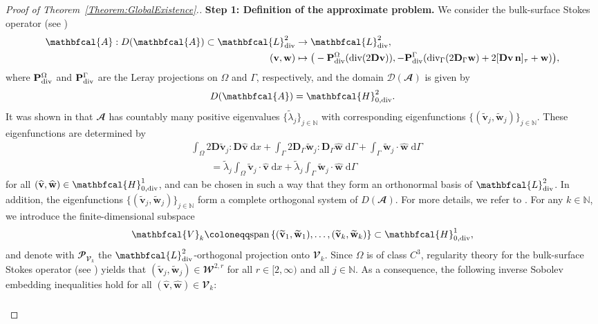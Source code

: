 \documentclass[10pt,reqno]{amsart}
\theoremstyle{remark}
\numberwithin{equation}{section}
\newcommand{\N}{\mathbb N}
\newcommand{\n}{\mathbf{n}}
\newcommand{\bv}{\mathbf{v}}
\newcommand{\bw}{\mathbf{w}}
\newcommand{\ww}{\widehat{\bw}}
\newcommand{\wv}{\widehat{\bv}}
\newcommand{\tv}{\widetilde{\bv}}
\newcommand{\tw}{\widetilde{\bw}}
\newcommand{\D}{\mathbf{D}}
\newcommand{\Dg}{\mathbf{D}_\Gamma}
\newcommand{\intO}{\int_\Omega}
\newcommand{\intG}{\int_\Gamma}
\newcommand{\dx}{\;\mathrm{d}x}
\newcommand{\dG}{\;\mathrm d\Ga}
\newcommand{\Div}{\textnormal{div}}
\newcommand{\Divg}{\textnormal{div}_\Ga}
\newcommand{\Om}{\Omega}
\newcommand{\Ga}{\Gamma}
\begin{document}
\begin{proof}[Proof of Theorem~\ref{Theorem:GlobalExistence}.]
\textbf{Step 1: Definition of the approximate problem.}
We consider the bulk-surface Stokes operator (see \cite[Section~5.3]{Knopf2025a})
\begin{align*}
    \mathbfcal{A}:D(\mathbfcal{A})\subset \mathbfcal{L}^2_\Div&\rightarrow\mathbfcal{L}^2_\Div, \\
    (\bv,\bw)&\mapsto \big(-\mathbf{P}_\Div^\Om(\Div(2\D\bv)), -\mathbf{P}_\Div^\Ga(\Divg(2\Dg\bw) + 2[\D\bv\,\n]_\tau + \bw)\big),
\end{align*}
where $\mathbf{P}_\Div^\Om$ and $\mathbf{P}_\Div^\Ga$ are the Leray projections on $\Om$ and $\Ga$, respectively, and the domain $\mathcal{D}(\mathbfcal{A})$ is given by
\begin{align*}
    D(\mathbfcal{A}) = \mathbfcal{H}^2_{0,\Div}.
\end{align*}
It was shown in \cite[Theorem~5.9]{Knopf2025a} that $\mathbfcal{A}$ has countably many positive eigenvalues $\{\widetilde\lambda_j\}_{j\in\N}$ with corresponding eigenfunctions $\{(\tv_j,\tw_j)\}_{j\in\N}$. These eigenfunctions are determined by
\begin{align*}
    &\intO 2\D\tv_j:\D\wv\dx + \intG 2\Dg\tw_j:\Dg\ww\dG + \intG \tw_j\cdot\ww\dG \\
    &\qquad = \widetilde\lambda_j\intO \tv_j\cdot\wv\dx + \widetilde\lambda_j \intG \tw_j\cdot\ww\dG
\end{align*}
for all $(\wv,\ww)\in\mathbfcal{H}^1_{0,\Div}$, and can be chosen in such a way that they form an orthonormal basis of $\mathbfcal{L}^2_\Div$. In addition, the eigenfunctions $\{(\tv_j,\tw_j)\}_{j\in\N}$ form a complete orthogonal system of $D(\mathbfcal{A})$. For more details, we refer to \cite[Section~5.3]{Knopf2025a}. For any $k\in\N$, we introduce the finite-dimensional subspace
\begin{align*}
    \mathbfcal{V}_k \coloneqq \mathrm{span}\,\{(\tv_1,\tw_1),\ldots,(\tv_k,\tw_k)\}\subset\mathbfcal{H}^1_{0,\Div},
\end{align*}
and denote with $\mathbfcal{P}_{\mathbfcal{V}_k}$ the $\mathbfcal{L}^2_\Div$-orthogonal projection  onto $\mathbfcal{V}_k$. Since $\Omega$ is of class $C^3$, regularity theory for the bulk-surface Stokes operator (see \cite[Theorem~5.7]{Knopf2025a}) yields that $(\tv_j,\tw_j)\in\mathbfcal{W}^{2,r}$ for all $r\in[2,\infty)$ and all $j\in\N$. As a consequence, the following inverse Sobolev embedding inequalities hold for all $(\wv,\ww)\in\mathbfcal{V}_k$:
\begin{align}
    \label{Est:InverseSobolev}
    \begin{split}

\end{split}
\end{align}
\end{proof}
\end{document}
